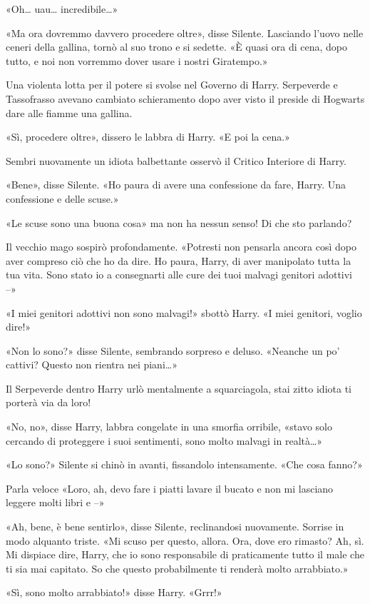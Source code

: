 «Oh… uau… incredibile…»

«Ma ora dovremmo davvero procedere oltre», disse Silente. Lasciando l’uovo nelle ceneri della gallina, tornò al suo trono e si sedette. «È quasi ora di cena, dopo tutto, e noi non vorremmo dover usare i nostri Giratempo.»

Una violenta lotta per il potere si svolse nel Governo di Harry. Serpeverde e Tassofrasso avevano cambiato schieramento dopo aver visto il preside di Hogwarts dare alle fiamme una gallina.

«Sì, procedere oltre», dissero le labbra di Harry. «E poi la cena.»

Sembri nuovamente un idiota balbettante osservò il Critico Interiore di Harry.

«Bene», disse Silente. «Ho paura di avere una confessione da fare, Harry. Una confessione e delle scuse.»

«Le scuse sono una buona cosa» ma non ha nessun senso! Di che sto parlando?

Il vecchio mago sospirò profondamente. «Potresti non pensarla ancora così dopo aver compreso ciò che ho da dire. Ho paura, Harry, di aver manipolato tutta la tua vita. Sono stato io a consegnarti alle cure dei tuoi malvagi genitori adottivi –»

«I miei genitori adottivi non sono malvagi!» sbottò Harry. «I miei genitori, voglio dire!»

«Non lo sono?» disse Silente, sembrando sorpreso e deluso. «Neanche un po’ cattivi? Questo non rientra nei piani…»

Il Serpeverde dentro Harry urlò mentalmente a squarciagola, stai zitto idiota ti porterà via da loro!

«No, no», disse Harry, labbra congelate in una smorfia orribile, «stavo solo cercando di proteggere i suoi sentimenti, sono molto malvagi in realtà…»

«Lo sono?» Silente si chinò in avanti, fissandolo intensamente. «Che cosa fanno?»

Parla veloce «Loro, ah, devo fare i piatti lavare il bucato e non mi lasciano leggere molti libri e –»

«Ah, bene, è bene sentirlo», disse Silente, reclinandosi nuovamente. Sorrise in modo alquanto triste. «Mi scuso per questo, allora. Ora, dove ero rimasto? Ah, sì. Mi dispiace dire, Harry, che io sono responsabile di praticamente tutto il male che ti sia mai capitato. So che questo probabilmente ti renderà molto arrabbiato.»

«Sì, sono molto arrabbiato!» disse Harry. «Grrr!»

